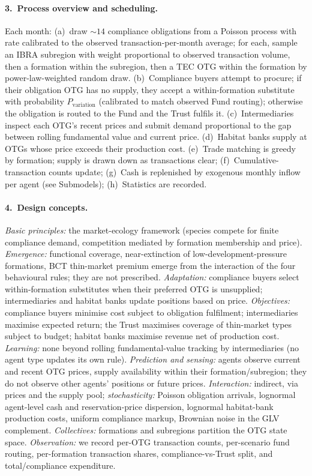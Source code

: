 \documentclass[pdflatex,sn-nature,oneside]{sn-jnl}
\begin{document}
\paragraph{3.~Process overview and scheduling.}
Each month: (a)~draw $\sim 14$ compliance obligations from a Poisson
process with rate calibrated to the observed transaction-per-month
average; for each, sample an IBRA subregion with weight proportional to
observed transaction volume, then a formation within the subregion, then
a TEC OTG within the formation by power-law-weighted random draw.
(b)~Compliance buyers attempt to procure; if their obligation OTG has no
supply, they accept a within-formation substitute with probability
$P_{\text{variation}}$ (calibrated to match observed Fund routing);
otherwise the obligation is routed to the Fund and the Trust fulfils it.
(c)~Intermediaries inspect each OTG's recent prices and submit demand
proportional to the gap between rolling fundamental value and current
price. (d)~Habitat banks supply at OTGs whose price exceeds their
production cost. (e)~Trade matching is greedy by formation; supply is
drawn down as transactions clear; (f)~Cumulative-transaction counts
update; (g)~Cash is replenished by exogenous monthly inflow per agent
(see Submodels); (h)~Statistics are recorded.

\paragraph{4.~Design concepts.}
\textit{Basic principles:} the market-ecology framework (species
compete for finite compliance demand, competition mediated by formation
membership and price). \textit{Emergence:} functional coverage,
near-extinction of low-development-pressure formations, BCT thin-market
premium emerge from the interaction of the four behavioural rules; they
are not prescribed. \textit{Adaptation:} compliance buyers select
within-formation substitutes when their preferred OTG is unsupplied;
intermediaries and habitat banks update positions based on price.
\textit{Objectives:} compliance buyers minimise cost subject to obligation
fulfilment; intermediaries maximise expected return; the Trust maximises
coverage of thin-market types subject to budget; habitat banks maximise
revenue net of production cost. \textit{Learning:} none beyond rolling
fundamental-value tracking by intermediaries (no agent type updates its
own rule). \textit{Prediction and sensing:} agents observe current and
recent OTG prices, supply availability within their formation/subregion;
they do not observe other agents' positions or future prices.
\textit{Interaction:} indirect, via prices and the supply pool;
\textit{stochasticity:} Poisson obligation arrivals, lognormal
agent-level cash and reservation-price dispersion, lognormal habitat-bank
production costs, uniform compliance markup, Brownian noise in the GLV
complement. \textit{Collectives:} formations and subregions partition
the OTG state space. \textit{Observation:} we record per-OTG
transaction counts, per-scenario fund routing, per-formation
transaction shares, compliance-vs-Trust split, and total/compliance
expenditure.
\end{document}
